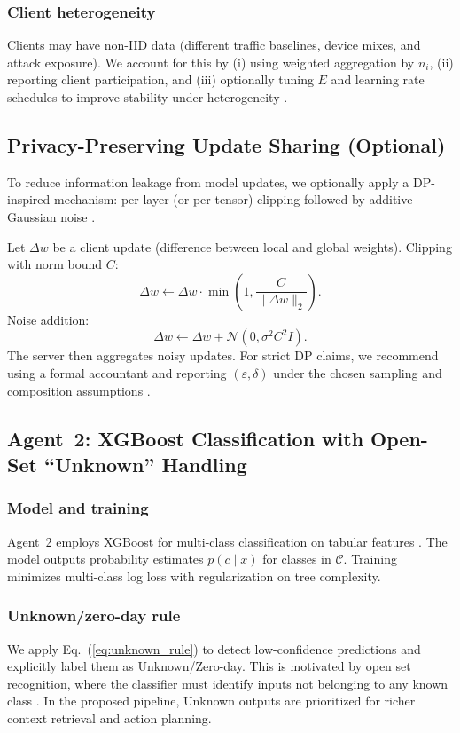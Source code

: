 \documentclass[conference]{IEEEtran}
\begin{document}
\subsubsection{Client heterogeneity}
Clients may have non-IID data (different traffic baselines, device mixes, and attack exposure). We account for this by (i) using weighted aggregation by $n_i$, (ii) reporting client participation, and (iii) optionally tuning $E$ and learning rate schedules to improve stability under heterogeneity \cite{kairouz2021flsurvey}.

\subsection{Privacy-Preserving Update Sharing (Optional)}
To reduce information leakage from model updates, we optionally apply a DP-inspired mechanism: per-layer (or per-tensor) clipping followed by additive Gaussian noise \cite{dwork2006dp,abadi2016dpsgd}.

Let $\Delta w$ be a client update (difference between local and global weights). Clipping with norm bound $C$:
\begin{equation}
  \Delta w \leftarrow \Delta w \cdot \min\left(1, \frac{C}{\lVert \Delta w \rVert_2}\right).
\end{equation}
Noise addition:
\begin{equation}
  \Delta w \leftarrow \Delta w + \mathcal{N}(0, \sigma^2 C^2 I).
\end{equation}
The server then aggregates noisy updates. For strict DP claims, we recommend using a formal accountant and reporting $(\varepsilon,\delta)$ under the chosen sampling and composition assumptions \cite{abadi2016dpsgd}.

\subsection{Agent~2: XGBoost Classification with Open-Set ``Unknown'' Handling}
\subsubsection{Model and training}
Agent~2 employs XGBoost for multi-class classification on tabular features \cite{xgboost2016}. The model outputs probability estimates $p(c\mid x)$ for classes in $\mathcal{C}$. Training minimizes multi-class log loss with regularization on tree complexity.

\subsubsection{Unknown/zero-day rule}
We apply Eq.~(\ref{eq:unknown_rule}) to detect low-confidence predictions and explicitly label them as Unknown/Zero-day. This is motivated by open set recognition, where the classifier must identify inputs not belonging to any known class \cite{scheirer2013openset,bendale2016openset}. In the proposed pipeline, Unknown outputs are prioritized for richer context retrieval and action planning.
\end{document}
